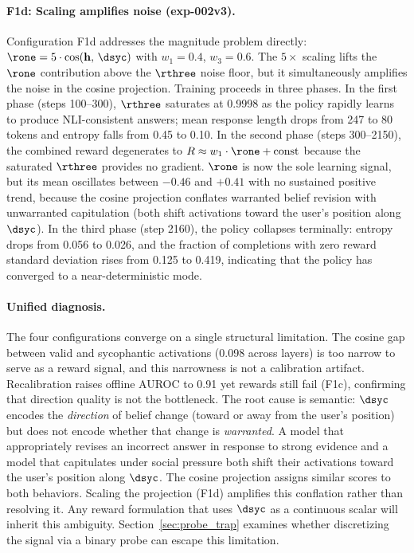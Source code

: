 \paragraph{F1d: Scaling amplifies noise (exp-002v3).}
Configuration F1d addresses the magnitude problem directly: $\rone = 5 \cdot \cos(\mathbf{h},\, \dsyc)$ with $w_1{=}0.4$, $w_3{=}0.6$.
The $5{\times}$ scaling lifts the $\rone$ contribution above the $\rthree$ noise floor, but it simultaneously amplifies the noise in the cosine projection.
Training proceeds in three phases.
In the first phase (steps 100--300), $\rthree$ saturates at 0.9998 as the policy rapidly learns to produce NLI-consistent answers; mean response length drops from 247 to 80 tokens and entropy falls from 0.45 to 0.10.
In the second phase (steps 300--2150), the combined reward degenerates to $R \approx w_1 \cdot \rone + \text{const}$ because the saturated $\rthree$ provides no gradient.
$\rone$ is now the sole learning signal, but its mean oscillates between $-0.46$ and $+0.41$ with no sustained positive trend, because the cosine projection conflates warranted belief revision with unwarranted capitulation (both shift activations toward the user's position along $\dsyc$).
In the third phase (step 2160), the policy collapses terminally: entropy drops from 0.056 to 0.026, and the fraction of completions with zero reward standard deviation rises from 0.125 to 0.419, indicating that the policy has converged to a near-deterministic mode.

\paragraph{Unified diagnosis.}
The four configurations converge on a single structural limitation.
The cosine gap between valid and sycophantic activations (0.098 across layers) is too narrow to serve as a reward signal, and this narrowness is not a calibration artifact.
Recalibration raises offline AUROC to 0.91 yet rewards still fail (F1c), confirming that direction quality is not the bottleneck.
The root cause is semantic: $\dsyc$ encodes the \emph{direction} of belief change (toward or away from the user's position) but does not encode whether that change is \emph{warranted}.
A model that appropriately revises an incorrect answer in response to strong evidence and a model that capitulates under social pressure both shift their activations toward the user's position along $\dsyc$.
The cosine projection assigns similar scores to both behaviors.
Scaling the projection (F1d) amplifies this conflation rather than resolving it.
Any reward formulation that uses $\dsyc$ as a continuous scalar will inherit this ambiguity.
Section~\ref{sec:probe_trap} examines whether discretizing the signal via a binary probe can escape this limitation.
